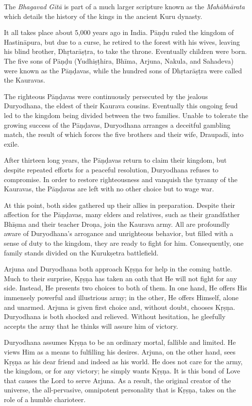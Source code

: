 The \textit{Bhagavad Gītā} is part of a much larger scripture known as the \textit{Mahābhārata} which details the history of the kings in the ancient Kuru dynasty. 

It all takes place about 5,000 years ago in India. Pāṇḍu ruled the kingdom of Hastināpura, but due to a curse, he retired to the forest with his wives, leaving his blind brother, Dhṛtarāṣṭra, to take the throne. Eventually children were born. The five sons of Pāṇḍu (Yudhiṣṭhira, Bhīma, Arjuna, Nakula, and Sahadeva) were known as the Pāṇḍavas, while the hundred sons of Dhṛtarāṣṭra were called the Kauravas. 

The righteous Pāṇḍavas were continuously persecuted by the jealous Duryodhana, the eldest of their Kaurava cousins. Eventually this ongoing feud led to the kingdom being divided between the two families. Unable to tolerate the growing success of the Pāṇḍavas, Duryodhana arranges a deceitful gambling match, the result of which forces the five brothers and their wife, Draupadī, into exile.

After thirteen long years, the Pāṇḍavas return to claim their kingdom, but despite repeated efforts for a peaceful resolution, Duryodhana refuses to compromise. In order to restore righteousness and vanquish the tyranny of the Kauravas, the Pāṇḍavas are left with no other choice but to wage war.

At this point, both sides gathered up their allies in preparation. Despite their affection for the Pāṇḍavas, many elders and relatives, such as their grandfather Bhīṣma and their teacher Droṇa, join the Kaurava army. All are profoundly aware of Duryodhana’s arrogance and unrighteous behavior, but filled with a sense of duty to the kingdom, they are ready to fight for him. Consequently, one family stands divided on the Kurukṣetra battlefield. 

Arjuna and Duryodhana both approach Kṛṣṇa for help in the coming battle. Much to their surprise, Kṛṣṇa has taken an oath that He will not fight for any side. Instead, He presents two choices to both of them. In one hand, He offers His immensely powerful and illustrious army; in the other, He offers Himself, alone and unarmed. Arjuna is given first choice and, without doubt, chooses Kṛṣṇa. Duryodhana is both shocked and relieved. Without hesitation, he gleefully accepts the army that he thinks will
assure him of victory.

Duryodhana assumes Kṛṣṇa to be an ordinary mortal, fallible and limited. He views Him as a means to fulfilling his desires. Arjuna, on the other hand, sees Kṛṣṇa as his dear friend and indeed as his world. He does not care for the army, the kingdom, or for any victory; he simply wants Kṛṣṇa. It is this bond of Love that causes the Lord to serve Arjuna. As a result, the original creator of the universe, the all-pervasive, omnipotent personality that is Kṛṣṇa, takes on the role of a humble charioteer.


